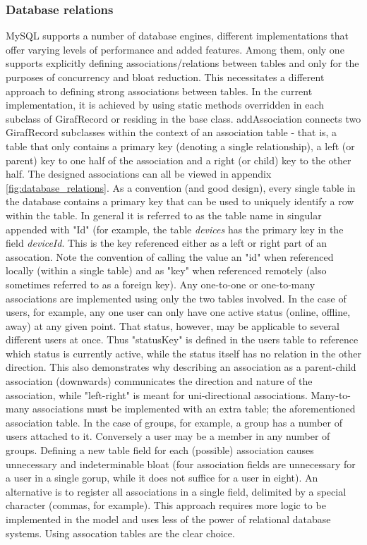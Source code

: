 \subsubsection{Database relations}
MySQL supports a number of database engines, different implementations that offer varying levels of performance and added features. Among them, only one supports explicitly defining associations/relations between tables and only for the purposes of concurrency and bloat reduction. This necessitates a different approach to defining strong associations between tables. In the current implementation, it is achieved by using static methods overridden in each subclass of GirafRecord or residing in the base class.
addAssociation connects two GirafRecord subclasses within the context of an association table - that is, a table that only contains a primary key (denoting a single relationship), a left (or parent) key to one half of the association and a right (or child) key to the other half. The designed associations can all be viewed in appendix \vref{fig:database_relations}.
As a convention (and good design), every single table in the database contains a primary key that can be used to uniquely identify a row within the table. In general it is referred to as the table name in singular appended with "Id" (for example, the table \emph{devices} has the primary key in the field \emph{deviceId}. This is the key referenced either as a left or right part of an assocation. Note the convention of calling the value an "id" when referenced locally (within a single table) and as "key" when referenced remotely (also sometimes referred to as a foreign key).
Any one-to-one or one-to-many associations are implemented using only the two tables involved. In the case of users, for example, any one user can only have one active status (online, offline, away) at any given point. That status, however, may be applicable to several different users at once. Thus "statusKey" is defined in the users table to reference which status is currently active, while the status itself has no relation in the other direction. This also demonstrates why describing an association as a parent-child association (downwards) communicates the direction and nature of the association, while "left-right" is meant for uni-directional associations.
Many-to-many associations must be implemented with an extra table; the aforementioned association table. In the case of groups, for example, a group has a number of users attached to it. Conversely a user may be a member in any number of groups. Defining a new table field for each (possible) association causes unnecessary and indeterminable bloat (four association fields are unnecessary for a user in a single gorup, while it does not suffice for a user in eight). An alternative is to register all associations in a single field, delimited by a special character (commas, for example). This approach requires more logic to be implemented in the model and uses less of the power of relational database systems. Using assocation tables are the clear choice.